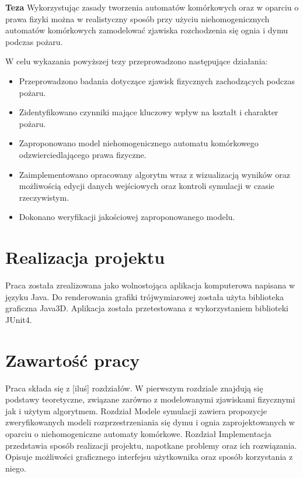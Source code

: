 


\textbf{Teza} Wykorzystując zasady tworzenia automatów komórkowych oraz w oparciu o prawa fizyki można w realistyczny sposób
przy użyciu niehomogenicznych 
automatów komórkowych
zamodelować zjawiska rozchodzenia się ognia i dymu podczas pożaru.

W celu wykazania powyższej tezy przeprowadzono następujące działania:
\begin{itemize}
\item Przeprowadzono badania dotyczące zjawisk fizycznych zachodzących podczas pożaru.
\item Zidentyfikowano czynniki mające kluczowy wpływ na kształt i charakter pożaru.
\item Zaproponowano model niehomogenicznego automatu komórkowego odzwierciedlającego prawa fizyczne.
\item Zaimplementowano opracowany algorytm wraz z wizualizacją wyników oraz możliwością edycji danych wejściowych oraz kontroli symulacji w czasie rzeczywistym.
\item Dokonano weryfikacji jakościowej zaproponowanego modelu.
\end{itemize}

\section {Realizacja projektu} %
Praca została zrealizowana jako wolnostojąca aplikacja komputerowa napisana w języku Java. Do renderowania grafiki trójwymiarowej
została użyta biblioteka graficzna Java3D. Aplikacja została przetestowana z wykorzystaniem biblioteki JUnit4. 

\section{Zawartość pracy} %
Praca składa się z [iluś] rozdziałów. 
W pierwszym rozdziale znajdują się podstawy teoretyczne, związane zarówno z modelowanymi zjawiskami fizycznymi jak i użytym algorytmem.
Rozdział Modele symulacji zawiera propozycje zweryfikowanych modeli rozprzestrzeniania się dymu i ognia zaprojektowanych w oparciu
o niehomogeniczne automaty komórkowe. Rozdział Implementacja przedstawia sposób realizacji projektu, napotkane problemy oraz 
ich rozwiązania. Opisuje możliwości graficznego interfejsu użytkownika oraz sposób korzystania z niego.
